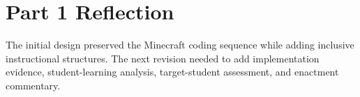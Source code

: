 \documentclass[12pt]{article}
\begin{document}
\section{Part 1 Reflection}
The initial design preserved the Minecraft coding sequence while adding inclusive instructional structures. The next revision needed to add implementation evidence, student-learning analysis, target-student assessment, and enactment commentary.
\end{document}
